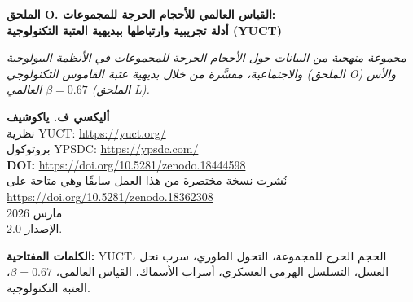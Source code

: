 \documentclass[12pt]{article}
\theoremstyle{remark}
\begin{document}
	
	\begin{titlepage}
		\begin{center}
			\vspace*{0.5cm}
			\Huge\textbf{الملحق O. القياس العالمي للأحجام الحرجة للمجموعات: \\ أدلة تجريبية وارتباطها ببديهية العتبة التكنولوجية (YUCT)}
			
			\vspace{0.3cm}
			\small\textit{مجموعة منهجية من البيانات حول الأحجام الحرجة للمجموعات في الأنظمة البيولوجية والاجتماعية، مفسَّرة من خلال بديهية عتبة القاموس التكنولوجي (الملحق O) والأس العالمي \(\beta = 0.67\) (الملحق L).}
			
			\vspace{0.3cm}
			\small\textbf{أليكسي ف. ياكوشيف} \\
			نظرية YUCT: \url{https://yuct.org/}\\
			بروتوكول YPSDC: \url{https://ypsdc.com/}\\
			
			\vspace{2cm}
			\textbf{DOI:} \url{https://doi.org/10.5281/zenodo.18444598}\\
			
			\vspace{1cm}
			\large 
			نُشرت نسخة مختصرة من هذا العمل سابقًا وهي متاحة على\\
			\url{https://doi.org/10.5281/zenodo.18362308}\\
			\vspace{1cm}
			مارس 2026 \\ \large الإصدار 2.0.
			
			\vspace{0.5cm}
			\begin{minipage}{0.95\textwidth}
				\begin{abstract}
					\noindent
					يجمع هذا الملحق بيانات تجريبية حول الأحجام الحرجة التي تشهد عندها الأنظمة الجماعية المختلفة تحولاً طورياً – مثل الأسراب، الانشطار، أو إعادة التنظيم الهيكلي. تشمل الأنظمة المدروسة مستعمرات نحل العسل، الوحدات العسكرية، أسراب الأسماك، مجموعات الدلافين، تجمعات الماشية، ومجموعات الرئيسيات. باستخدام قانون الخطأ العالمي \(\varepsilon \propto N^{\beta}\) مع \(\beta = 0.67\) (الملحق L) وبديهية عتبة القاموس التكنولوجي (الملحق O)، نشتق علاقة كمية بين الحجم الحرج \(N_{\text{crit}}\) الذي يحدث عنده التحول والحجم الأمثل للمجموعة \(N_{\text{opt}}\). تتجمع النسب الملاحظة \(N_{\text{crit}}/N_{\text{opt}}\) للأنظمة المتنوعة حول قيم متسقة مع \(\beta = 0.67\)، مما يوفر دعمًا مستقلاً لعالمية هذا الأس وللفكرة القائلة بأن تجاوز عتبة تكنولوجية (أو تنظيمية) يقابل تحولاً طورياً في كفاءة التنسيق. نقترح أيضًا تنبؤات محددة قابلة للاختبار لتجارب ودراسات ميدانية مستقبلية يمكن أن تزيد من التحقق من إطار YUCT.
				\end{abstract}
			\end{minipage}
			
			\vspace{0.3cm}
			\noindent
			\small\textbf{الكلمات المفتاحية:} YUCT، الحجم الحرج للمجموعة، التحول الطوري، سرب نحل العسل، التسلسل الهرمي العسكري، أسراب الأسماك، القياس العالمي، \(\beta = 0.67\)، العتبة التكنولوجية.
		\end{center}
	\end{titlepage}
	
\end{document}
